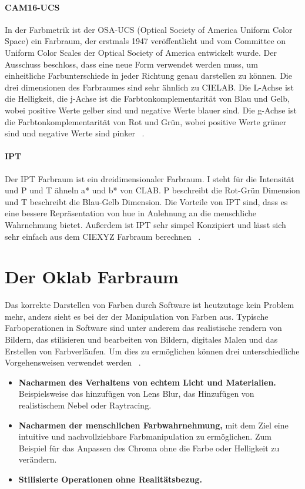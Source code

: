 \documentclass[12pt, a4paper, ngerman]{article}
\begin{document}
\paragraph{CAM16-UCS}
In der Farbmetrik ist der OSA-UCS (Optical Society of America Uniform Color Space) ein Farbraum, 
der erstmals 1947 veröffentlicht und vom Committee on Uniform Color Scales der Optical Society of America entwickelt wurde.
Der Ausschuss beschloss, dass eine neue Form verwendet werden muss, 
um einheitliche Farbunterschiede in jeder Richtung genau darstellen zu können.
Die drei dimensionen des Farbraumes sind sehr ähnlich zu CIELAB.
Die L-Achse ist die Helligkeit, die j-Achse ist die Farbtonkomplementarität von Blau und Gelb, 
wobei positive Werte gelber sind und negative Werte blauer sind.
Die g-Achse ist die Farbtonkomplementarität von Rot und Grün, 
wobei positive Werte grüner sind und negative Werte sind pinker ~\cite{OSA-UCS_2023}.

\paragraph{IPT}
Der IPT Farbraum ist ein dreidimensionaler Farbraum.
I steht für die Intensität und P und T ähneln a* und b* von CLAB. 
P beschreibt die Rot-Grün Dimension und T beschreibt die Blau-Gelb Dimension.
Die Vorteile von IPT sind, dass es eine bessere Repräsentation von hue 
in Anlehnung an die menschliche Wahrnehmung bietet. 
Außerdem ist IPT sehr simpel Konzipiert und lässt sich sehr einfach aus dem CIEXYZ Farbraum berechnen ~\cite{Ebner_1998}.

\section{Der Oklab Farbraum}
Das korrekte Darstellen von Farben durch Software ist heutzutage kein Problem mehr, 
anders sieht es bei der der Manipulation von Farben aus.
Typische Farboperationen in Software sind unter anderem das realistische rendern von Bildern, 
das stilisieren und bearbeiten von Bildern, digitales Malen und das Erstellen von Farbverläufen. 
Um dies zu ermöglichen können drei unterschiedliche Vorgehensweisen verwendet werden ~\cite{Ottosson_2020}.
\begin{itemize}
  \item \textbf{Nacharmen des Verhaltens von echtem Licht und Materialien.} Beispielsweise das hinzufügen von Lens Blur, das Hinzufügen von realistischem Nebel oder Raytracing.
  \item \textbf{Nacharmen der menschlichen Farbwahrnehmung,} mit dem Ziel eine intuitive und nachvollziehbare Farbmanipulation zu ermöglichen. Zum Beispiel für das Anpassen des Chroma ohne die Farbe oder Helligkeit zu verändern.
  \item \textbf{Stilisierte Operationen ohne Realitätsbezug.} 
\end{itemize}
\end{document}
